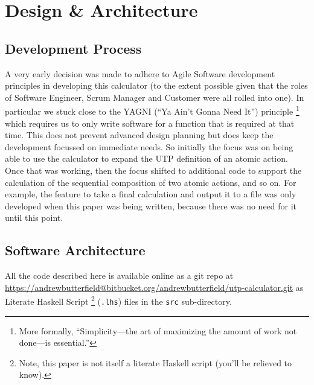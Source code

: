 \section{Design \& Architecture}\label{sec:Design}

\subsection{Development Process}\label{ssec:development}

A very early decision was made to adhere to Agile Software development
principles \cite{Fowl01a}
in developing this calculator
(to the extent possible given that the roles of Software Engineer, Scrum Manager
and Customer were all rolled into one).
In particular we stuck close to the YAGNI (``Ya Ain't Gonna Need It'') principle%
\footnote{More formally, ``Simplicity---the art of maximizing the amount
of work not done---is essential.''}
which requires us to only write software for a function
that is required at that time.
This does not prevent advanced design planning but does keep
the development focussed on immediate needs.
So initially the focus was on being able to use the calculator
to expand the UTP definition of an atomic action.
Once that was working, then the focus shifted to additional code to
support the calculation of the sequential composition of two atomic actions,
and so on.
For example, the feature to take a final calculation and output it to a file
was only developed when this paper was being written,
because there was no need for it until this point.

\subsection{Software Architecture}\label{ssec:architecture}

All the code described here is available online as a git repo
at
\\\url{https://andrewbutterfield@bitbucket.org/andrewbutterfield/utp-calculator.git}
as Literate Haskell Script%
\footnote{
Note, this paper is not itself a literate Haskell script
(you'll be relieved to know).
}
(\texttt{.lhs}) files in the \texttt{src} sub-directory.

